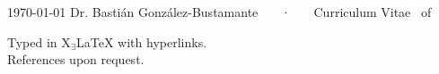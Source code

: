 \documentclass[11pt, a4paper]{bgonzalezbustamante-style}
\begin{document}
\makecvheader

\makecvfooter
  {\today}
  {Dr. Bastián González-Bustamante ~~~·~~~ Curriculum Vitae}
  {\thepage\ of \pageref*{LastPage}}




















\vspace{10mm}
\raggedleft
{\footnotesize Typed in {\small X$_{\exists}${\LaTeX}} with hyperlinks.}\\
{\footnotesize References upon request.}%
\end{document}
